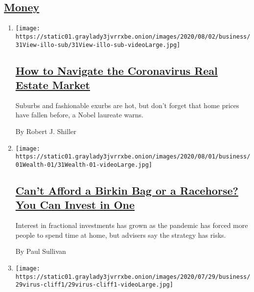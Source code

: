 \hypertarget{money}{%
\subsection{\texorpdfstring{\protect\hyperlink{}{Money}}{Money}}\label{money}}

\begin{enumerate}
\def\labelenumi{\arabic{enumi}.}
\item
  \texttt{[image: https://static01.graylady3jvrrxbe.onion/images/2020/08/02/business/31View-illo-sub/31View-illo-sub-videoLarge.jpg]}

  \hypertarget{how-to-navigate-the-coronavirus-real-estate-market}{%
  \subsection{\texorpdfstring{\href{/2020/07/31/business/housing-market-prices-risk.html}{How
  to Navigate the Coronavirus Real Estate
  Market}}{How to Navigate the Coronavirus Real Estate Market}}\label{how-to-navigate-the-coronavirus-real-estate-market}}

  Suburbs and fashionable exurbs are hot, but don't forget that home
  prices have fallen before, a Nobel laureate warns.

  By Robert J. Shiller
\item
  \texttt{[image: https://static01.graylady3jvrrxbe.onion/images/2020/08/01/business/01Wealth-01/31Wealth-01-videoLarge.jpg]}

  \hypertarget{cant-afford-a-birkin-bag-or-a-racehorse-you-can-invest-in-one}{%
  \subsection{\texorpdfstring{\href{/2020/07/31/your-money/birkin-bag-racehorse-invest.html}{Can't
  Afford a Birkin Bag or a Racehorse? You Can Invest in
  One}}{Can't Afford a Birkin Bag or a Racehorse? You Can Invest in One}}\label{cant-afford-a-birkin-bag-or-a-racehorse-you-can-invest-in-one}}

  Interest in fractional investments has grown as the pandemic has
  forced more people to spend time at home, but advisers say the
  strategy has risks.

  By Paul Sullivan
\item
  \texttt{[image: https://static01.graylady3jvrrxbe.onion/images/2020/07/29/business/29virus-cliff1/29virus-cliff1-videoLarge.jpg]}

  \hypertarget{an-extra-600-a-week-kept-many-jobless-workers-afloat-now-what-will-they-do}{%
}
\end{enumerate}
